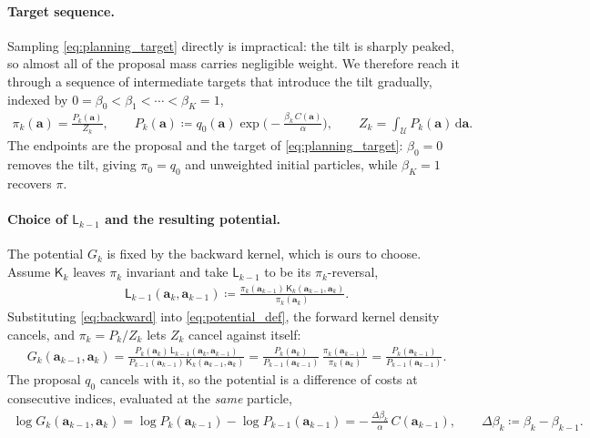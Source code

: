 \paragraph{Target sequence.}
Sampling \eqref{eq:planning_target} directly is impractical: the tilt is sharply peaked, so
almost all of the proposal mass carries negligible weight. We therefore reach it through a
sequence of intermediate targets that introduce the tilt gradually, indexed by
$0=\beta_0<\beta_1<\cdots<\beta_K=1$,
\begin{align}\label{eq:targets}
\pi_k(\mathbf{a}) = \frac{P_k(\mathbf{a})}{Z_k},
\qquad
P_k(\mathbf{a}) \coloneqq q_0(\mathbf{a})\exp\!\Big(-\frac{\beta_k\,C(\mathbf{a})}{\alpha}\Big),
\qquad
Z_k = \int_{\mathcal{U}} P_k(\mathbf{a})\,\mathrm{d}\mathbf{a} .
\end{align}
The endpoints are the proposal and the target of \eqref{eq:planning_target}: $\beta_0=0$
removes the tilt, giving $\pi_0=q_0$ and unweighted initial particles, while $\beta_K=1$
recovers $\pi$.

\paragraph{Choice of $\mathsf{L}_{k-1}$ and the resulting potential.}
The potential $G_k$ is fixed by the backward kernel, which is ours to choose. Assume
$\mathsf{K}_k$ leaves $\pi_k$ invariant and take $\mathsf{L}_{k-1}$ to be its
$\pi_k$-reversal,
\begin{align}\label{eq:backward}
\mathsf{L}_{k-1}(\mathbf{a}_k,\mathbf{a}_{k-1})
\coloneqq
\frac{\pi_k(\mathbf{a}_{k-1})\,\mathsf{K}_k(\mathbf{a}_{k-1},\mathbf{a}_k)}
     {\pi_k(\mathbf{a}_k)} .
\end{align}
Substituting \eqref{eq:backward} into \eqref{eq:potential_def}, the forward kernel density
cancels, and $\pi_k=P_k/Z_k$ lets $Z_k$ cancel against itself:
\begin{align}\label{eq:G_derivation}
G_k(\mathbf{a}_{k-1},\mathbf{a}_k)
=
\frac{P_k(\mathbf{a}_k)\,\mathsf{L}_{k-1}(\mathbf{a}_k,\mathbf{a}_{k-1})}
     {P_{k-1}(\mathbf{a}_{k-1})\,\mathsf{K}_k(\mathbf{a}_{k-1},\mathbf{a}_k)}
=
\frac{P_k(\mathbf{a}_k)}{P_{k-1}(\mathbf{a}_{k-1})}
\,
\frac{\pi_k(\mathbf{a}_{k-1})}{\pi_k(\mathbf{a}_k)}
=
\frac{P_k(\mathbf{a}_{k-1})}{P_{k-1}(\mathbf{a}_{k-1})} .
\end{align}
The proposal $q_0$ cancels with it, so the potential is a difference of costs at
consecutive indices, evaluated at the \emph{same} particle,
\begin{align}\label{eq:logG}
\log G_k(\mathbf{a}_{k-1},\mathbf{a}_k)
=
\log P_k(\mathbf{a}_{k-1})-\log P_{k-1}(\mathbf{a}_{k-1})
=
-\,\frac{\Delta\beta_k}{\alpha}\,C(\mathbf{a}_{k-1}),
\qquad
\Delta\beta_k\coloneqq\beta_k-\beta_{k-1} .
\end{align}

